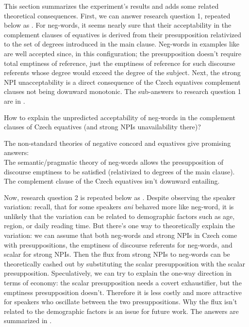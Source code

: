 This section summarizes the experiment's results and adds some related theoretical consequences. First, we can answer research question 1, repeated below as . For neg-words, it seems nearly sure that their acceptability in the complement clauses of equatives is derived from their presupposition relativized to the set of degrees introduced in the main clause. Neg-words in examples like  are well accepted since, in this configuration; the presupposition doesn't require total emptiness of reference, just the emptiness of reference for such discourse referents whose degree would exceed the degree of the subject. Next, the strong NPI unacceptability is a direct consequence of the Czech equatives complement clauses not being downward monotonic. The sub-answers to research question 1 are in .

\ea\label{ex-22} How to explain the unpredicted acceptability of neg-words in the complement clauses of Czech equatives (and strong NPIs unavailability there)?
\z

\ea\label{ex-23} The non-standard theories of negative concord and equatives give promising answers:\\
  \ea The semantic/pragmatic theory of neg-words allows the presupposition of discourse emptiness to be satisfied (relativized to degrees of the main clause).\\
  \ex The complement clause of the Czech equatives isn't downward entailing.\z\z

Now, research question 2 is repeated below as . Despite observing the speaker variation: recall, that for some speakers \textit{ani} behaved more like neg-word, it is unlikely that the variation can be related to demographic factors such as age, region, or daily reading time. But there's one way to theoretically explain the variation: we can assume that both neg-words and strong NPIs in Czech come with presuppositions, the emptiness of discourse referents for neg-words, and scalar for strong NPIs. Then the flux from strong NPIs to neg-words can be theoretically cashed out by substituting the scalar presupposition with the scalar presupposition. Speculatively, we can try to explain the one-way direction in terms of economy: the scalar presupposition needs a covert exhaustifier, but the emptiness presupposition doesn't. Therefore it is less costly and more attractive for speakers who oscillate between the two presuppositions. Why the flux isn't related to the demographic factors is an issue for future work. The answers are summarized in .

